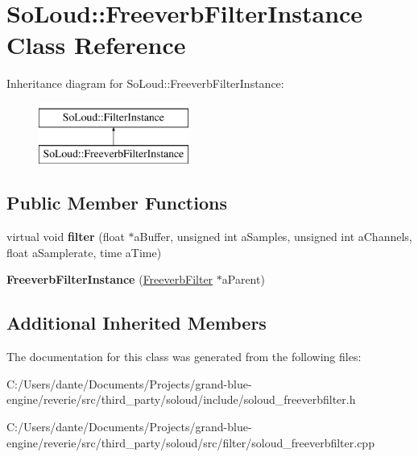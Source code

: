 \hypertarget{class_so_loud_1_1_freeverb_filter_instance}{}\section{So\+Loud\+::Freeverb\+Filter\+Instance Class Reference}
\label{class_so_loud_1_1_freeverb_filter_instance}
Inheritance diagram for So\+Loud\+::Freeverb\+Filter\+Instance\+:\begin{figure}[H]
\begin{center}
\leavevmode
\includegraphics[height=2.000000cm]{class_so_loud_1_1_freeverb_filter_instance}
\end{center}
\end{figure}
\subsection*{Public Member Functions}
\begin{DoxyCompactItemize}
\item 
\mbox{\label{class_so_loud_1_1_freeverb_filter_instance_a0d1d36c4e10c508749b42dc535b12443}} 
virtual void {\bfseries filter} (float $\ast$a\+Buffer, unsigned int a\+Samples, unsigned int a\+Channels, float a\+Samplerate, time a\+Time)
\item 
\mbox{\label{class_so_loud_1_1_freeverb_filter_instance_a695339dca3ef669eaf4887562de67629}} 
{\bfseries Freeverb\+Filter\+Instance} (\mbox{\hyperlink{class_so_loud_1_1_freeverb_filter}{Freeverb\+Filter}} $\ast$a\+Parent)
\end{DoxyCompactItemize}
\subsection*{Additional Inherited Members}


The documentation for this class was generated from the following files\+:\begin{DoxyCompactItemize}
\item 
C\+:/\+Users/dante/\+Documents/\+Projects/grand-\/blue-\/engine/reverie/src/third\+\_\+party/soloud/include/soloud\+\_\+freeverbfilter.\+h\item 
C\+:/\+Users/dante/\+Documents/\+Projects/grand-\/blue-\/engine/reverie/src/third\+\_\+party/soloud/src/filter/soloud\+\_\+freeverbfilter.\+cpp\end{DoxyCompactItemize}

